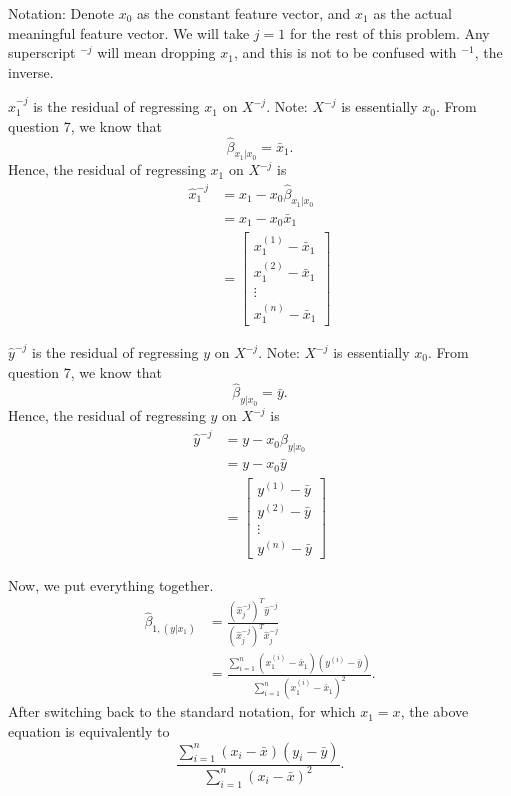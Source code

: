 \documentclass[
]{article}
\begin{document}
Notation: Denote \(x_0\) as the constant feature vector, and \(x_1\) as
the actual meaningful feature vector. We will take \(j = 1\) for the
rest of this problem. Any superscript \(^{-j}\) will mean dropping
\(x_1\), and this is not to be confused with \(^{-1}\), the inverse.

\(\hat{x}_1^{-j}\) is the residual of regressing \(x_1\) on \(X^{-j}\).
Note: \(X^{-j}\) is essentially \(x_0\). From question 7, we know that
\[\hat{\beta}_{x_1|x_0} = \bar{x}_1.\] Hence, the residual of regressing
\(x_1\) on \(X^{-j}\) is \begin{align*}
    \hat{x}_1^{-j} & = x_1 - x_0\hat{\beta}_{x_1|x_0} \\
    & = x_1 - x_0\bar{x}_1 \\
    & = \begin{bmatrix}
        x_1^{(1)} - \bar{x}_1 \\
        x_1^{(2)} - \bar{x}_1 \\
        \vdots \\
        x_1^{(n)} - \bar{x}_1 
    \end{bmatrix}
\end{align*}

\(\hat{y}^{-j}\) is the residual of regressing \(y\) on \(X^{-j}\).
Note: \(X^{-j}\) is essentially \(x_0\). From question 7, we know that
\[\hat{\beta}_{y|x_0} = \bar{y}.\] Hence, the residual of regressing
\(y\) on \(X^{-j}\) is \begin{align*}
    \hat{y}^{-j} & = y - x_0\hat{\beta}_{y|x_0} \\
    & = y - x_0\bar{y} \\
    & = \begin{bmatrix}
        y^{(1)} - \bar{y} \\
        y^{(2)} - \bar{y} \\
        \vdots \\
        y^{(n)} - \bar{y} 
    \end{bmatrix}
\end{align*}

Now, we put everything together. \begin{align*}
    \hat{\beta}_{1, (y|x_1)} & = \frac{\left(\hat{x}_j^{-j}\right)^T\hat{y}^{-j}}{\left(\hat{x}_j^{-j}\right)^T\hat{x}_j^{-j}} \\
    & = \frac{\sum_{i=1}^{n}\left(x_1^{(i)}-\bar{x}_1\right)\left(y^{(i)}-\bar{y}\right)}{\sum_{i=1}^{n}\left(x_1^{(i)} - \bar{x}_1\right)^2}.
\end{align*} After switching back to the standard notation, for which
\(x_1 = x\), the above equation is equivalently to
\[\frac{\sum_{i=1}^n (x_i - \bar{x}) (y_i - \bar{y})}{\sum_{i=1}^n (x_i - \bar{x})^2}.\]
\end{document}
